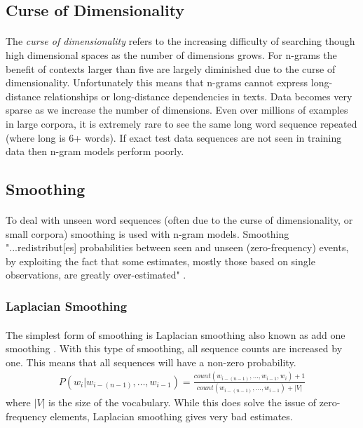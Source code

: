 \documentclass[12pt]{ociamthesis}
\begin{document}
\subsection{Curse of Dimensionality}
\paragraph{}
The \emph{curse of dimensionality} refers to the increasing difficulty of searching though high dimensional spaces as the number of dimensions grows. For n-grams the benefit of contexts larger than five are largely diminished due to the curse of dimensionality. Unfortunately this means that n-grams cannot express long-distance relationships or long-distance dependencies in texts. Data becomes very sparse as we increase the number of dimensions. Even over millions of examples in large corpora, it is extremely rare to see the same long word sequence repeated (where long is 6+ words). If exact test data sequences are not seen in training data then n-gram models perform poorly.
\subsection{Smoothing}
\paragraph{}
To deal with unseen word sequences (often due to the curse of dimensionality, or small corpora) smoothing is used with n-gram models. Smoothing "...redistribut[es] probabilities between seen and unseen (zero-frequency) events, by
exploiting the fact that some estimates, mostly those based on single observations, are greatly over-estimated" \cite[pg. 16]{Mikolav2012}.
\subsubsection{Laplacian Smoothing}
\paragraph{}
The simplest form of smoothing is Laplacian smoothing also known as add one smoothing \cite{Jurafsky2009}. With this type of smoothing, all sequence counts are increased by one. This means that all sequences will have a non-zero probability. 
\begin{align}
P(w_i | w_{i-(n-1)},\dots, w_{i-1}) = \frac{count(w_{i-(n-1)},\dots,w_{i-1},w_i)+1}{count(w_{i-(n-1)},\dots,w_{i-1})+|V|}
\end{align}
where $|V|$ is the size of the vocabulary. While this does solve the issue of zero-frequency elements, Laplacian smoothing gives very bad estimates. 
\end{document}
